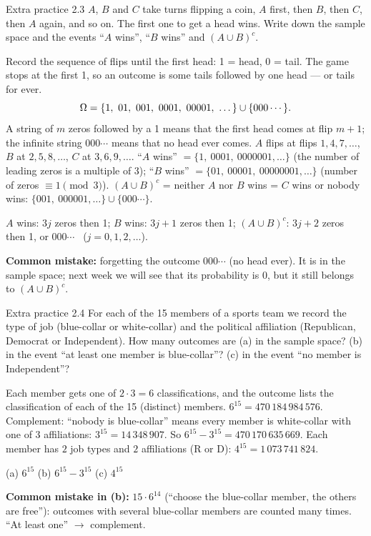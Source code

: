 \begin{task}{Extra practice 2.3}
	$A$, $B$ and $C$ take turns flipping a coin, $A$ first, then $B$, then $C$,
	then $A$ again, and so on. The first one to get a head wins. Write down the
	sample space and the events ``$A$ wins'', ``$B$ wins'' and $(A\cup B)^c$.
\end{task}
\workspace{3cm}

\ifsolutions
	\soltitle
	\idea Record the sequence of flips until the first head: 1 = head, 0 =
	tail. The game stops at the first 1, so an outcome is some tails followed by
	one head --- or tails for ever.
	\[ \Om=\{1,\ 01,\ 001,\ 0001,\ 00001,\ \dots\}\cup\{000\cdots\}. \]
	A string of $m$ zeros followed by a 1 means that the first head comes at flip
	$m+1$; the infinite string $000\cdots$ means that no head ever comes.
	 $A$ flips at flips $1,4,7,\dots$, $B$ at
	$2,5,8,\dots$, $C$ at $3,6,9,\dots$.
	 ``$A$ wins'' $=\{1,\ 0001,\ 0000001,\dots\}$ (the number of
	leading zeros is a multiple of 3); ``$B$ wins'' $=\{01,\ 00001,\ 00000001,
		\dots\}$ (number of zeros $\equiv1\pmod 3$).
	$(A\cup B)^c$ = neither $A$ nor $B$ wins = $C$ wins or nobody wins:
	$\{001,\ 000001,\dots\}\cup\{000\cdots\}$.
	\begin{answer}
		$A$ wins: $3j$ zeros then 1; $B$ wins: $3j+1$ zeros then 1;
		$(A\cup B)^c$: $3j+2$ zeros then 1, or $000\cdots$ \ ($j=0,1,2,\dots$).
	\end{answer}
	\begin{remark}
		\textbf{Common mistake:} forgetting the outcome $000\cdots$ (no head ever).
		It is in the sample space; next week we will see that its probability is
		0, but it still belongs to $(A\cup B)^c$.
	\end{remark}
\fi

\begin{task}{Extra practice 2.4}
	For each of the 15 members of a sports team we record the type of job
	(blue-collar or white-collar) and the political affiliation (Republican,
	Democrat or Independent). How many outcomes are (a) in the sample space?
	(b) in the event ``at least one member is blue-collar''? (c) in the event
	``no member is Independent''?
\end{task}
\workspace{3cm}

\ifsolutions
	\soltitle
	\idea Each member gets one of $2\cdot3=6$ classifications, and the outcome
	lists the classification of each of the 15 (distinct) members.
	 $6^{15}=470\,184\,984\,576$.
	 Complement: ``nobody is blue-collar'' means every member is
	white-collar with one of 3 affiliations: $3^{15}=14\,348\,907$. So
	$6^{15}-3^{15}=470\,170\,635\,669$.
	 Each member has $2$ job types and $2$ affiliations (R or D):
	$4^{15}=1\,073\,741\,824$.
	\begin{answer}
		(a) $6^{15}$ \quad (b) $6^{15}-3^{15}$ \quad (c) $4^{15}$
	\end{answer}
	\begin{remark}
		\textbf{Common mistake in (b):} $15\cdot6^{14}$ (``choose the blue-collar
		member, the others are free''): outcomes with several blue-collar members
		are counted many times. ``At least one'' $\to$ complement.
	\end{remark}
\fi

